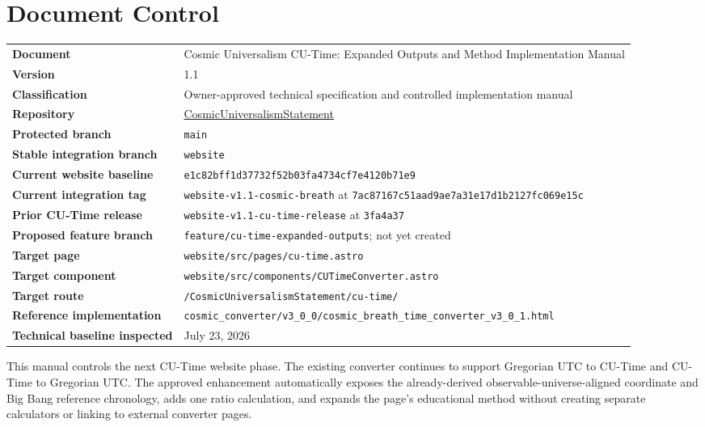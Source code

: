 \documentclass[11pt,letterpaper]{article}
\newcommand{\RepositoryName}{CosmicUniversalismStatement}
\newcommand{\RepositoryURL}{https://github.com/willmaddock/CosmicUniversalismStatement}
\newcommand{\ProtectedBranch}{main}
\newcommand{\StableBranch}{website}
\newcommand{\ProposedBranch}{feature/cu-time-expanded-outputs}
\newcommand{\TargetRoute}{/CosmicUniversalismStatement/cu-time/}
\newcommand{\CurrentWebsiteFullCommit}{e1c82bff1d37732f52b03fa4734cf7e4120b71e9}
\newcommand{\CurrentIntegrationTag}{website-v1.1-cosmic-breath}
\newcommand{\CurrentIntegrationCommit}{7ac87167c51aad9ae7a31e17d1b2127fc069e15c}
\newcommand{\PriorCuTimeTag}{website-v1.1-cu-time-release}
\newcommand{\PriorCuTimeCommit}{3fa4a37}
\newcommand{\DocumentVersion}{1.1}
\newcommand{\VerificationDate}{July 23, 2026}
\newcommand{\filepath}[1]{\nolinkurl{#1}}
\newcommand{\branchname}[1]{\texttt{#1}}
\newcommand{\release}[1]{\texttt{#1}}
\begin{document}
\hypersetup{pageanchor=true}
\nopagecolor
\color{CUText}

\section*{Document Control}

\begin{tabularx}{\textwidth}{>{\bfseries}L{1.95in}Y}
Document & Cosmic Universalism CU-Time: Expanded Outputs and Method Implementation Manual \\
Version & \DocumentVersion \\
Classification & Owner-approved technical specification and controlled implementation manual \\
Repository & \href{\RepositoryURL}{\RepositoryName} \\
Protected branch & \branchname{\ProtectedBranch} \\
Stable integration branch & \branchname{\StableBranch} \\
Current website baseline & \release{\CurrentWebsiteFullCommit} \\
Current integration tag & \release{\CurrentIntegrationTag} at \release{\CurrentIntegrationCommit} \\
Prior CU-Time release & \release{\PriorCuTimeTag} at \release{\PriorCuTimeCommit} \\
Proposed feature branch & \branchname{\ProposedBranch}; not yet created \\
Target page & \filepath{website/src/pages/cu-time.astro} \\
Target component & \filepath{website/src/components/CUTimeConverter.astro} \\
Target route & \filepath{\TargetRoute} \\
Reference implementation & \filepath{cosmic\_converter/v3\_0\_0/cosmic\_breath\_time\_converter\_v3\_0\_1.html} \\
Technical baseline inspected & \VerificationDate \\
\end{tabularx}

\begin{purposebox}
This manual controls the next CU-Time website phase. The existing converter
continues to support Gregorian UTC to CU-Time and CU-Time to Gregorian UTC.
The approved enhancement automatically exposes the already-derived
observable-universe-aligned coordinate and Big Bang reference chronology,
adds one ratio calculation, and expands the page's educational method without
creating separate calculators or linking to external converter pages.
\end{purposebox}
\end{document}
